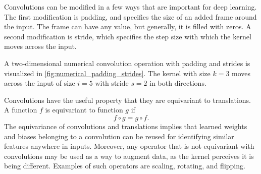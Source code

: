 Convolutions can be modified in a few ways that are important for deep learning.
The first modification is padding, and specifies the size of an added frame around the input.
The frame can have any value, but generally, it is filled with zeros.
A second modification is stride, which specifies the step size with which the kernel moves across the input.

A two-dimensional numerical convolution operation with padding and strides is visualized in \cref{fig:numerical_padding_strides}.
The kernel with size $k=3$ moves across the input of size $i=5$ with stride $s = 2$ in both directions.

Convolutions have the useful property that they are equivariant to translations.
A function $f$ is equivariant to function $g$ if
\begin{equation}
    f \circ g = g \circ f.
\end{equation}
The equivariance of convolutions and translations implies that learned weights and biases belonging to a convolution can be reused for identifying similar features anywhere in inputs.
Moreover, any operator that is not equivariant with convolutions may be used as a way to augment data, as the kernel perceives it is being different.
Examples of such operators are scaling, rotating, and flipping.

